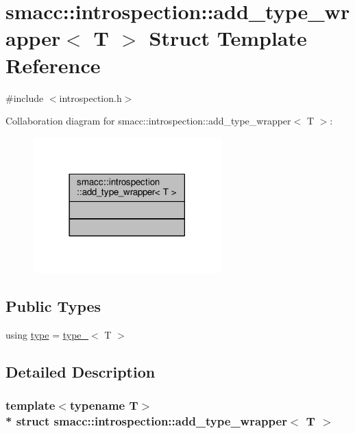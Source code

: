 \hypertarget{structsmacc_1_1introspection_1_1add__type__wrapper}{}\section{smacc\+:\+:introspection\+:\+:add\+\_\+type\+\_\+wrapper$<$ T $>$ Struct Template Reference}
\label{structsmacc_1_1introspection_1_1add__type__wrapper}


{\ttfamily \#include $<$introspection.\+h$>$}



Collaboration diagram for smacc\+:\+:introspection\+:\+:add\+\_\+type\+\_\+wrapper$<$ T $>$\+:\nopagebreak
\begin{figure}[H]
\begin{center}
\leavevmode
\includegraphics[width=206pt]{structsmacc_1_1introspection_1_1add__type__wrapper__coll__graph}
\end{center}
\end{figure}
\subsection*{Public Types}
\begin{DoxyCompactItemize}
\item 
using \hyperlink{structsmacc_1_1introspection_1_1add__type__wrapper_a4390a0426686e1e115d4c3ad22165cd9}{type} = \hyperlink{structsmacc_1_1introspection_1_1type__}{type\+\_\+}$<$ T $>$
\end{DoxyCompactItemize}


\subsection{Detailed Description}
\subsubsection*{template$<$typename T$>$\\*
struct smacc\+::introspection\+::add\+\_\+type\+\_\+wrapper$<$ T $>$}



